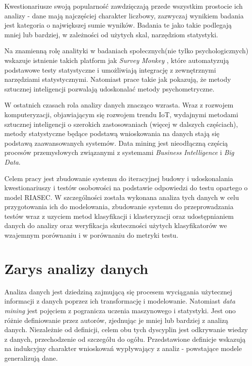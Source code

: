 \documentclass[12pt,a4paper,oneside]{report} %
\begin{document}
Kwestionariusze swoją popularność zawdzięczają przede wszystkim prostocie ich analizy - dane mają najczęściej charakter liczbowy, zazwyczaj wynikiem badania jest kategoria o największej sumie wyników. Badania te jako takie podlegają mniej lub bardziej, w zależności od użytych skal, narzędziom statystyki. \par

Na znamienną rolę analityki w badaniach społecznych(nie tylko psychologicznych) wskazuje istnienie takich platform jak \emph{Survey Monkey} \cite{surveymonkey}, które automatyzują podstawowe testy statystyczne i umożliwiają integrację z zewnętrznymi narzędziami statystycznymi. Natomiast prace takie jak \cite{test-postaw-milosnych} pokazują, że metody sztucznej inteligencji pozwalają udoskonalać metody psychometryczne.\par

W ostatnich czasach rola analizy danych znacząco wzrasta. Wraz z rozwojem komputeryzacji, objawiającym się rozwojem trendu IoT, wydajnymi metodami sztucznej inteligencji o szerokich zastosowaniach (więcej w dalszych częściach), metody statystyczne będące podstawą wnioskowania na danych stają się podstawą zaawansowanych systemów. Data mining jest nieodłączną częścią procesów przemysłowych związanymi z systemami \emph{Business Intelligence} i \emph{Big Data}. \par

Celem pracy jest zbudowanie systemu do iteracyjnej budowy i udoskonalania kwestionariuszy i testów osobowości na podstawie odpowiedzi do testu opartego o model RIASEC. W szczególności została wykonana analiza tych danych w celu przygotowania ich do modelowania, zbudowanie systemu do przeprowadzania testów wraz z uzyciem metod klasyfikacji i klasteryzacji oraz udostępnianiem danych do analizy oraz weryfikacja skuteczności użytych klasyfikatorów we wzajemnym porównaniu i w porównaniu do metryki testu.\par










\chapter{Zarys analizy danych}

Analiza danych jest dziedziną zajmującą się procesem wyciągania użytecznej informacji z danych poprzez ich transformację i modelowanie. Natomiast \emph{data mining} jest pojęciem z pogranicza uczenia maszynowego i statystyki. Jest ono różnie definiowanie przez autorów, zjednując je mniej lub bardziej z analizą danych. Niezależnie od definicji, celem obu tych dyscyplin jest odkrywanie wiedzy z danych, przechodzenie od szczegółu do ogółu. Przedstawione definicje wskazują na indukcyjny charakter wnioskowań wypływający z analiz - powstające modele generalizują dane.\par
\end{document}
